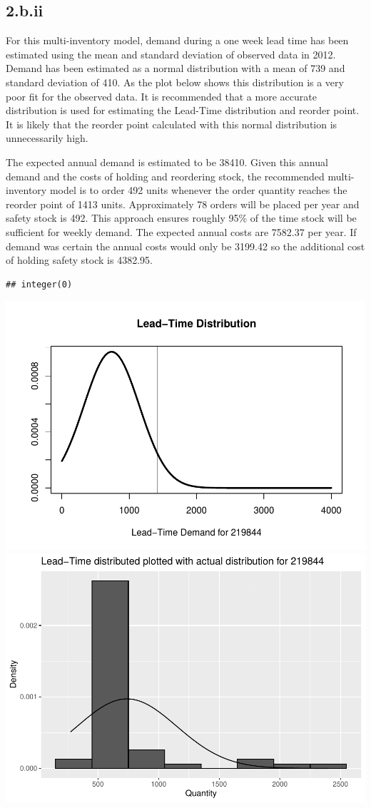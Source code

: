\documentclass[
  11pt,
]{article}
\begin{document}
\hypertarget{b.ii}{%
\subsection{2.b.ii}\label{b.ii}}

For this multi-inventory model, demand during a one week lead time has
been estimated using the mean and standard deviation of observed data in
2012. Demand has been estimated as a normal distribution with a mean of
739 and standard deviation of 410. As the plot below shows this
distribution is a very poor fit for the observed data. It is recommended
that a more accurate distribution is used for estimating the Lead-Time
distribution and reorder point. It is likely that the reorder point
calculated with this normal distribution is unnecessarily high.

The expected annual demand is estimated to be 38410. Given this annual
demand and the costs of holding and reordering stock, the recommended
multi-inventory model is to order 492 units whenever the order quantity
reaches the reorder point of 1413 units. Approximately 78 orders will be
placed per year and safety stock is 492. This approach ensures roughly
95\% of the time stock will be sufficient for weekly demand. The
expected annual costs are 7582.37 per year. If demand was certain the
annual costs would only be 3199.42 so the additional cost of holding
safety stock is 4382.95.

\begin{verbatim}
## integer(0)
\end{verbatim}

\includegraphics[width=0.5\linewidth]{Assignment-STAT702---final_files/figure-latex/2bii lead-time distribution plot, figures-side-1}
\includegraphics[width=0.5\linewidth]{Assignment-STAT702---final_files/figure-latex/2bii lead-time distribution plot, figures-side-2}
\end{document}
